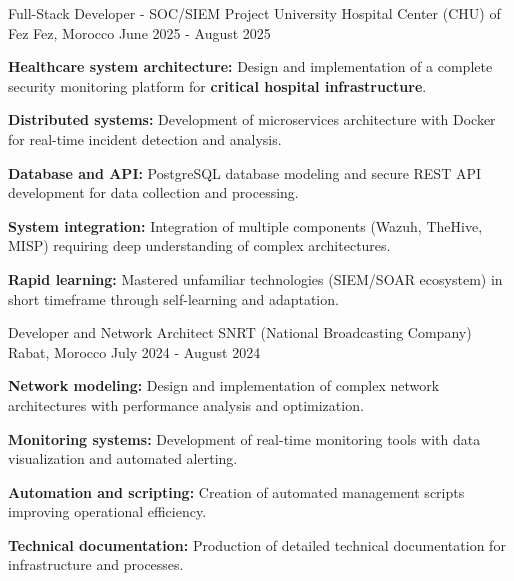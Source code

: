 
\begin{cventries}

    \cventry
    {Full-Stack Developer - SOC/SIEM Project} %
    {University Hospital Center (CHU) of Fez} %
    {Fez, Morocco} %
    {June 2025 - August 2025} %
    {
        \begin{cvitems}
            \item {
                        \textbf{Healthcare system architecture:} Design and implementation of a complete security monitoring platform for \textbf{critical hospital infrastructure}.}
            \item {
                        \textbf{Distributed systems:} Development of microservices architecture with Docker for real-time incident detection and analysis.}
            \item {
                        \textbf{Database and API:} PostgreSQL database modeling and secure REST API development for data collection and processing.}
            \item {
                        \textbf{System integration:} Integration of multiple components (Wazuh, TheHive, MISP) requiring deep understanding of complex architectures.}
            \item {
                        \textbf{Rapid learning:} Mastered unfamiliar technologies (SIEM/SOAR ecosystem) in short timeframe through self-learning and adaptation.}
        \end{cvitems}
    }

    \cventry
    {Developer and Network Architect} %
    {SNRT (National Broadcasting Company)} %
    {Rabat, Morocco} %
    {July 2024 - August 2024} %
    {
        \begin{cvitems}
            \item {\textbf{Network modeling:} Design and implementation of complex network architectures with performance analysis and optimization.}
            \item {\textbf{Monitoring systems:} Development of real-time monitoring tools with data visualization and automated alerting.}
            \item {\textbf{Automation and scripting:} Creation of automated management scripts improving operational efficiency.}
            \item {\textbf{Technical documentation:} Production of detailed technical documentation for infrastructure and processes.}
        \end{cvitems}
    }


\end{cventries}
